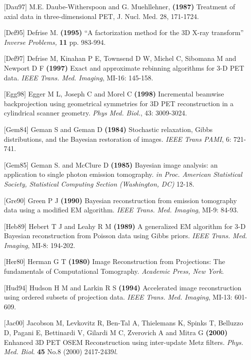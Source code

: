 \documentclass{article}
\begin{document}
{[}Dau97] M.E. Daube-Witherspoon and G. Muehllehner, \textbf{(1987)} 
Treatment of axial data in three-dimensional PET, 
J. Nucl. Med. 28, 171-1724.

{[}Def95] Defrise M. \textbf{(1995)} ``A factorization method for the 
3D X-ray transform'' \textit{Inverse Problems,} \textbf{11} pp. 983-994.


{[}Def97] Defrise M, Kinahan P E, Townsend D W, Michel C, Sibomana 
M and Newport D F \textbf{(1997)} Exact and approximate rebinning 
algorithms for 3-D PET data. \textit{IEEE Trans. Med. Imaging}, MI-16: 
145-158.

{[}Egg98] Egger M L, Joseph C and Morel C \textbf{(1998)} Incremental 
beamwise backprojection using geometrical symmetries for 3D PET 
reconstruction in a cylindrical scanner geometry. \textit{Phys Med. 
Biol.}, 43: 3009-3024.


{[}Gem84] Geman S and Geman D \textbf{(1984)} Stochastic relaxation, 
Gibbs distributions, and the Bayesian restoration of images. \textit{IEEE 
Trans PAMI}, 6: 721-741.


{[}Gem85] Geman S. and McClure D \textbf{(1985)} Bayesian image analysis: 
an application to single photon emission tomography. \textit{in Proc. 
American Statistical Society, Statistical Computing Section (Washington, 
DC)} 12-18.


 {[}Gre90] Green P J \textbf{(1990)} Bayesian reconstruction from emission 
tomography data using a modified EM algorithm. \textit{IEEE Trans. 
Med. Imaging}, MI-9: 84-93.


{[}Heb89] Hebert T J and Leahy R M \textbf{(1989)} A generalized EM 
algorithm for 3-D Bayesian reconstruction from Poisson data using 
Gibbs priors. \textit{IEEE Trans. Med. Imaging}, MI-8: 194-202.


{[}Her80] Herman G T \textbf{(1980)} Image Reconstruction from Projections: 
The fundamentals of Computational Tomography. \textit{Academic Press, 
New York}.

{[}Hud94] Hudson H M and Larkin R S \textbf{(1994)} Accelerated image 
reconstruction using ordered subsets of projection data. \textit{IEEE 
Trans. Med. Imaging}, MI-13: 601-609.


{[}Jac00] Jacobson M, Levkovitz R, Ben-Tal A, Thielemans K, Spinks 
T, Belluzzo D, Pagani E, Bettinardi V, Gilardi M C, Zverovich 
A and Mitra G \textbf{(2000)} Enhanced 3D PET OSEM Reconstruction 
using inter-update Metz filters. \textit{Phys. Med. Biol}. \textbf{45} No.8 
(2000) 2417-2439\textit{l.}
\end{document}
